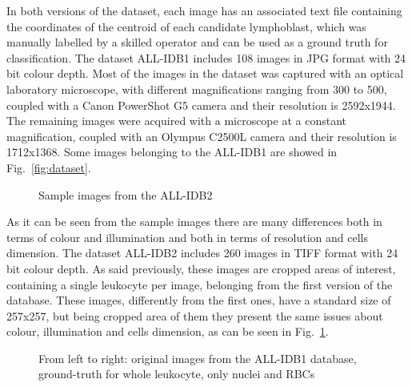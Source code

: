 \documentclass[final,a4paper,12pt,english]{UnicaPhdThesis3}
\begin{document}
In both versions of the dataset, each image has an associated text file containing  the coordinates of the centroid of each candidate  lymphoblast, which was manually labelled by a skilled operator and can be used as a ground  truth for classification. The dataset ALL-IDB1 includes 108 images in JPG format with 24 bit colour depth. Most of the images in the dataset was captured with an optical laboratory microscope, with different magnifications ranging from 300 to 500, coupled with a Canon PowerShot G5 camera and their resolution is 2592x1944. The remaining images were acquired with a microscope at a constant magnification, coupled with an Olympus C2500L camera and their resolution is 1712x1368. Some images belonging to the ALL-IDB1 are showed in Fig.~\ref{fig:dataset}.

\begin{figure}[!htbp]
\centering
\caption{\label{fig:dataset2}Sample images from the ALL-IDB2}
\end{figure}

As it can be seen from the sample images there are many differences both in terms of colour and illumination and both in terms of resolution and cells dimension. The dataset ALL-IDB2 includes 260 images in TIFF format with 24 bit colour depth. As said previously, these images are cropped areas of interest, containing a single leukocyte per image, belonging from the first version of the database. These images, differently from the first ones, have a standard size of 257x257, but being cropped area of them they present the same issues about colour, illumination and cells dimension, as can be seen in Fig.~\ref{fig:dataset2}.

\begin{figure}[!htbp]
\centering
\caption{\label{fig:datasetgt1}From left to right: original images from the ALL-IDB1 database, ground-truth for whole leukocyte, only nuclei and RBCs}
\end{figure}
\end{document}
